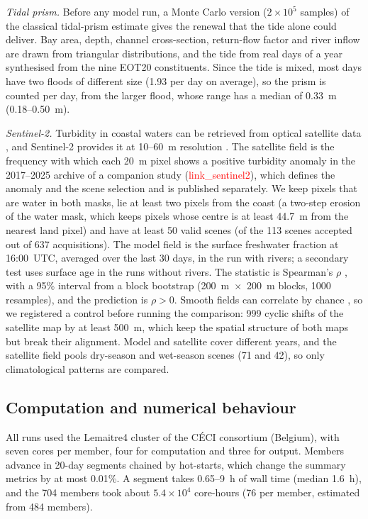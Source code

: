 \documentclass[a4paper,fleqn]{ems-dc}
\newcommand{\ph}[1]{\textcolor{red}{\textsf{#1}}}
\begin{document}
\emph{Tidal prism.} Before any model run, a Monte Carlo version ($2\times10^5$ samples) of the
classical tidal-prism estimate \citep{Fischer1979,Sanford1992} gives the renewal that the tide
alone could deliver. Bay area, depth, channel cross-section,
return-flow factor and river inflow are drawn from triangular distributions, and the tide
from real days of a year synthesised from the nine EOT20 constituents. Since the tide is
mixed, most days have two floods of different size (1.93 per day on average), so the prism is
counted per day, from the larger flood, whose range has a median of 0.33~m (0.18--0.50~m).

\emph{Sentinel-2.} Turbidity in coastal waters can be retrieved from optical satellite data
\citep{Dogliotti2015}, and Sentinel-2 provides it at 10--60~m resolution \citep{Drusch2012}. The satellite field is the frequency with which each 20~m pixel shows a
positive turbidity anomaly in the 2017--2025 archive of a companion study
(\ph{link\_sentinel2}), which defines the anomaly and the scene selection and is published
separately. We keep pixels that are water in both masks, lie at least two pixels from the
coast (a two-step erosion of the water mask, which keeps pixels whose centre is at least
44.7~m from the nearest land pixel) and have at least 50 valid scenes (of the 113 scenes
accepted out of 637 acquisitions). The model field is the surface freshwater fraction at
16:00~UTC, averaged over the last 30 days, in the run with rivers; a secondary test uses
surface age in the runs without rivers. The statistic is Spearman's $\rho$ \citep{Spearman1904}, with a 95\%
interval from a block bootstrap \citep{Kunsch1989} (200~m~$\times$~200~m blocks, 1000 resamples), and the
prediction is $\rho > 0$. Smooth fields can correlate by chance \citep{Clifford1989,Lennon2000}, so we registered a control
before running the comparison: 999 cyclic shifts of the satellite map by at least 500~m,
which keep the spatial structure of both maps but break their alignment. Model and satellite
cover different years, and the satellite field pools dry-season and wet-season scenes (71 and
42), so only climatological patterns are compared.

\subsection{Computation and numerical behaviour}\label{sec:res-model}
All runs used the Lemaitre4 cluster of the C\'ECI consortium (Belgium), with seven cores per
member, four for computation and three for output. Members advance in 20-day segments
chained by hot-starts, which change the summary metrics by at most 0.01\%. A segment takes
0.65--9~h of wall time (median 1.6~h), and the 704 members took about $5.4\times10^4$
core-hours (76 per member, estimated from 484 members).
\end{document}
